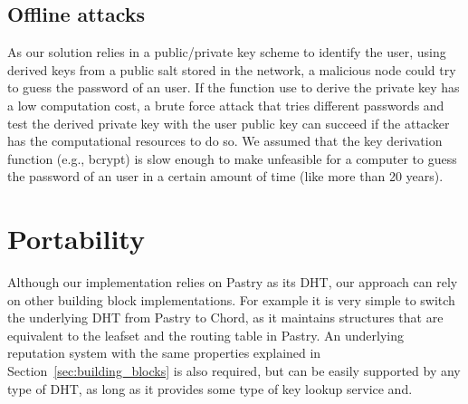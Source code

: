 \subsection{Offline attacks}
As our solution relies in a public/private key scheme to identify the user,
using derived keys from a public salt stored in the network, a malicious node
could try to guess the password of an user. If the function use to derive the
private key has a low computation cost, a brute force attack that tries
different passwords and test the derived private key with the user public key
can succeed if the attacker has the computational resources to do so. We
assumed that the key derivation function (e.g., bcrypt) is slow enough to make
unfeasible for a computer to guess the password of an user in a certain
amount of time (like more than 20 years).



\section{Portability}

Although our implementation relies on Pastry as its DHT, our approach can rely
on other building block implementations. For example it is very simple to
switch the underlying DHT from Pastry to Chord, as it maintains structures
that are equivalent to the leafset and the routing table in Pastry. An
underlying reputation system with the same properties explained
in Section~\ref{sec:building_blocks}  is also required, but can be easily
supported by any type of DHT, as long as it provides some type of key lookup
service and.
